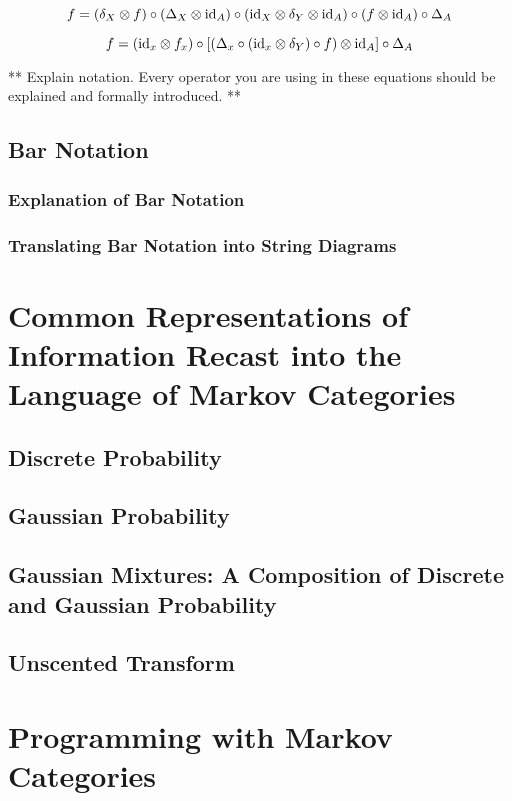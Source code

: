 \begin{equation}
\label{eq:conditional-compositions}
f = (\delta_X \otimes f) \circ (\Delta_X \otimes \mathrm{id}_A)
\circ (\mathrm{id}_X \otimes \delta_Y \otimes \mathrm{id}_A) \circ (f \otimes \mathrm{id}_A) \circ \Delta_A
\end{equation}

\begin{equation}
\label{eq:conditional-parallel-compositions}
f = (\mathrm{id}_x \otimes f_x) \circ \left[\left(\Delta_x \circ (\mathrm{id}_x\otimes \delta_Y) \circ f\right) \otimes \mathrm{id}_A\right] \circ \Delta_A
\end{equation}

** Explain notation. Every operator you are using in these equations should be explained and formally introduced. **

\section{Bar Notation}
\subsection{Explanation of Bar Notation}
\subsection{Translating Bar Notation into String Diagrams}

\chapter{Common Representations of Information Recast into the Language of Markov Categories}
\section{Discrete Probability}
\section{Gaussian Probability}
\section{Gaussian Mixtures: A Composition of Discrete and Gaussian Probability}
\section{Unscented Transform}

\chapter{Programming with Markov Categories}
